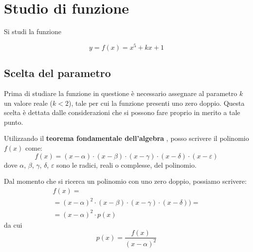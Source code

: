 \mainmatter

\chapter{Studio di funzione}

Si studi la funzione 

\begin{equation}
y=f(x)=x^5+kx+1
\end{equation}

\section{Scelta del parametro}

Prima di studiare la funzione in questione è necessario assegnare al parametro $k$ un valore reale ($k<2$), tale per cui  la funzione presenti uno zero doppio. Questa scelta è dettata dalle considerazioni che si possono fare proprio in merito a tale punto.

Utilizzando il \textbf{teorema fondamentale dell'algebra} \parencite[148-150]{courant:mate}, posso scrivere il polinomio $f(x)$ come:
\[
f(x)=(x-\alpha)\cdot(x-\beta)\cdot(x-\gamma)\cdot(x-\delta)\cdot(x-\varepsilon)
\]
dove $\alpha$, $\beta$, $\gamma$, $\delta$, $\varepsilon$ sono le radici, reali o complesse, del polinomio.

Dal momento che si ricerca un polinomio con uno zero doppio, possiamo scrivere:
\begin{multline*}
f(x)=\\
=(x-\alpha)^2\cdot(x-\beta)\cdot(x-\gamma)\cdot(x-\delta))=\\
=(x-\alpha)^2\cdot p(x)
\end{multline*}
da cui
\[
p(x)=\frac{f(x)}{(x-\alpha)^2}
\]

